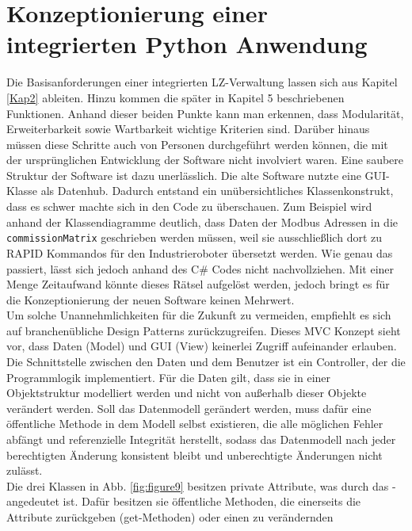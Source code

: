 

\chapter{Konzeptionierung einer integrierten Python Anwendung}\label{PythonApp}

Die Basisanforderungen einer integrierten LZ-Verwaltung lassen sich aus Kapitel \ref{Kap2} ableiten.
Hinzu kommen die später in Kapitel 5 beschriebenen Funktionen.
Anhand dieser beiden Punkte kann man erkennen, dass Modularität, Erweiterbarkeit sowie Wartbarkeit wichtige Kriterien sind.
Darüber hinaus müssen diese Schritte auch von Personen durchgeführt werden können, die mit der ursprünglichen Entwicklung
der Software nicht involviert waren.
Eine saubere Struktur der Software ist dazu unerlässlich.
Die alte Software nutzte eine GUI-Klasse als Datenhub.
Dadurch entstand ein unübersichtliches Klassenkonstrukt, dass es schwer machte sich in den Code zu überschauen.
Zum Beispiel wird anhand der Klassendiagramme deutlich, dass Daten der Modbus Adressen in die \verb|commissionMatrix|
geschrieben werden müssen, weil sie ausschließlich dort zu RAPID Kommandos für den Industrieroboter übersetzt werden.
Wie genau das passiert, lässt sich jedoch anhand des C\# Codes nicht nachvollziehen.
Mit einer Menge Zeitaufwand könnte dieses Rätsel aufgelöst werden, jedoch bringt es für die Konzeptionierung der neuen
Software keinen Mehrwert.\\
\vspace{1cm}
Um solche Unannehmlichkeiten für die Zukunft zu vermeiden, empfiehlt es sich auf branchenübliche Design Patterns
zurückzugreifen.
Dieses MVC Konzept sieht vor, dass Daten (Model) und GUI (View) keinerlei Zugriff aufeinander erlauben.
Die Schnittstelle zwischen den Daten und dem Benutzer ist ein Controller, der die Programmlogik implementiert.
Für die Daten gilt, dass sie in einer Objektstruktur modelliert werden und nicht von außerhalb dieser Objekte verändert
werden.
\vspace{1cm}
Soll das Datenmodell gerändert werden, muss dafür eine öffentliche Methode in dem Modell selbst existieren,
die alle möglichen Fehler abfängt und referenzielle Integrität herstellt, sodass das Datenmodell nach jeder berechtigten
Änderung konsistent bleibt und unberechtigte Änderungen nicht zulässt.\\
Die drei Klassen in Abb. \ref{fig:figure9} besitzen private Attribute, was durch das \glqq - \grqq angedeutet ist.
Dafür besitzen sie öffentliche Methoden, die einerseits die Attribute zurückgeben (get-Methoden) oder einen zu verändernden
